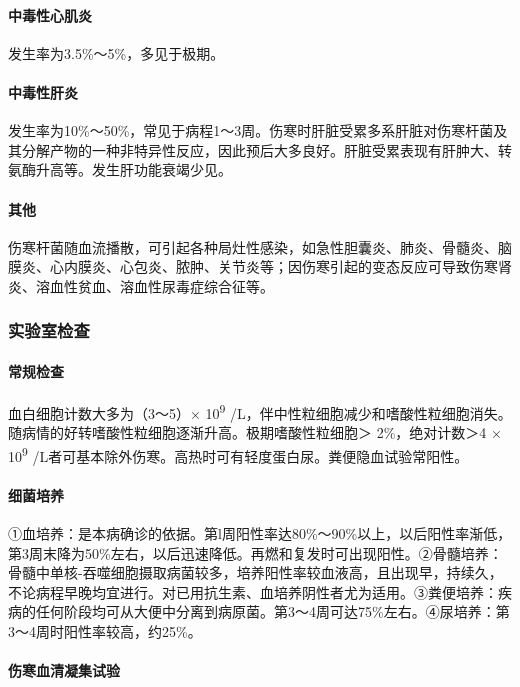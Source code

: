 \paragraph{中毒性心肌炎}

发生率为3.5\%～5\%，多见于极期。

\paragraph{中毒性肝炎}

发生率为10\%～50\%，常见于病程1～3周。伤寒时肝脏受累多系肝脏对伤寒杆菌及其分解产物的一种非特异性反应，因此预后大多良好。肝脏受累表现有肝肿大、转氨酶升高等。发生肝功能衰竭少见。

\paragraph{其他}

伤寒杆菌随血流播散，可引起各种局灶性感染，如急性胆囊炎、肺炎、骨髓炎、脑膜炎、心内膜炎、心包炎、脓肿、关节炎等；因伤寒引起的变态反应可导致伤寒肾炎、溶血性贫血、溶血性尿毒症综合征等。

\subsubsection{实验室检查}

\paragraph{常规检查}

血白细胞计数大多为（3～5）× 10\textsuperscript{9}
/L，伴中性粒细胞减少和嗜酸性粒细胞消失。随病情的好转嗜酸性粒细胞逐渐升高。极期嗜酸性粒细胞＞
2\%，绝对计数＞4 × 10\textsuperscript{9}
/L者可基本除外伤寒。高热时可有轻度蛋白尿。粪便隐血试验常阳性。

\paragraph{细菌培养}

①血培养：是本病确诊的依据。第l周阳性率达80\%～90\%以上，以后阳性率渐低，第3周末降为50\%左右，以后迅速降低。再燃和复发时可出现阳性。②骨髓培养：骨髓中单核-吞噬细胞摄取病菌较多，培养阳性率较血液高，且出现早，持续久，不论病程早晚均宜进行。对已用抗生素、血培养阴性者尤为适用。③粪便培养：疾病的任何阶段均可从大便中分离到病原菌。第3～4周可达75\%左右。④尿培养：第3～4周时阳性率较高，约25\%。

\paragraph{伤寒血清凝集试验}

